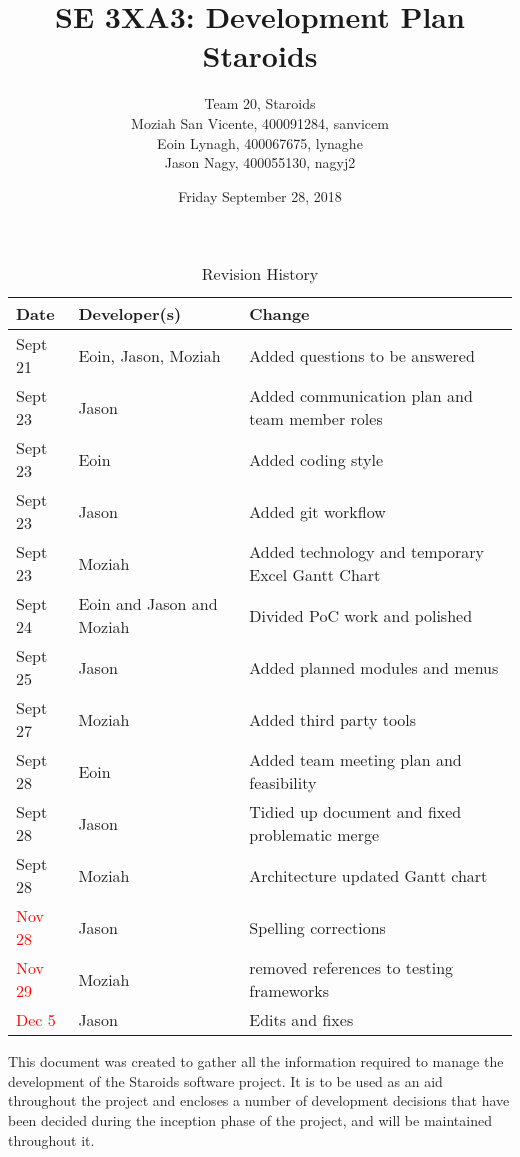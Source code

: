 \documentclass{article}
\title{SE 3XA3: Development Plan\\Staroids}
\author{Team 20, Staroids
		\\ Moziah San Vicente, 400091284, sanvicem
		\\ Eoin Lynagh, 400067675, lynaghe
		\\ Jason Nagy, 400055130, nagyj2
}
\date{Friday September 28, 2018}
\begin{document}
\begin{table}[hp]
\caption{Revision History} \label{TblRevisionHistory}
\begin{tabularx}{\textwidth}{llX}
\toprule
\textbf{Date} & \textbf{Developer(s)} & \textbf{Change}\\
\midrule
Sept 21 & Eoin, Jason, Moziah & Added questions to be answered\\
Sept 23 & Jason & Added communication plan and team member roles\\
Sept 23 & Eoin & Added coding style\\
Sept 23 & Jason & Added git workflow\\
Sept 23 & Moziah & Added technology and temporary Excel Gantt Chart\\
Sept 24 & Eoin and Jason and Moziah & Divided PoC work and polished\\
Sept 25 & Jason & Added planned modules and menus\\
Sept 27 & Moziah & Added third party tools\\
Sept 28 & Eoin & Added team meeting plan and feasibility\\
Sept 28 & Jason & Tidied up document and fixed problematic merge\\
Sept 28 & Moziah & Architecture updated Gantt chart\\
\textcolor{red}{Nov 28} & Jason & Spelling corrections\\
\textcolor{red}{Nov 29} & Moziah & removed references to testing frameworks\\
\textcolor{red}{Dec 5} & Jason & Edits and fixes\\
\bottomrule
\end{tabularx}
\end{table}

\newpage

\tableofcontents

\maketitle

This document was created to gather all the information required to manage the development of the Staroids software project. It is to be used as an aid throughout the project and encloses a number of development decisions that have been decided during the inception phase of the project, and will be maintained throughout it.
\end{document}
